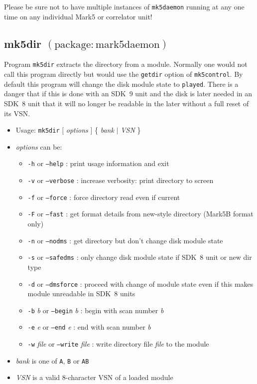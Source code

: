 Please be sure not to have multiple instances of {\tt mk5daemon} running at any one time on any individual Mark5 or correlator unit!








\subsection{mk5dir {\small $\mathrm{(package: mark5daemon)}$}} \label{sec:mk5dir}

Program {\tt mk5dir} extracts the directory from a module.
Normally one would not call this program directly but would use the {\tt getdir} option of {\tt mk5control}.
By default this program will change the disk module state to {\tt played}.
There is a danger that if this is done with an SDK~9 unit and the disk is later needed in an SDK~8 unit that it will no longer be readable in the later without a full reset of its VSN.

\begin{itemize}
\item[] Usage: {\tt mk5dir} $[$ {\em options} $]$ \{ {\em bank} $\mid$ {\em VSN} \}
\item[] {\em options} can be:
\begin{itemize}
\item[] {\tt -h} or {\tt --help} : print usage information and exit
\item[] {\tt -v} or {\tt --verbose} : increase verbosity: print directory to screen
\item[] {\tt -f} or {\tt --force} : force directory read even if current
\item[] {\tt -F} or {\tt --fast} : get format details from new-style directory (Mark5B format only)
\item[] {\tt -n} or {\tt --nodms} : get directory but don't change disk module state
\item[] {\tt -s} or {\tt --safedms} : only change disk module state if SDK~8 unit or new dir type
\item[] {\tt -d} or {\tt --dmsforce} : proceed with change of module state even if this makes module unreadable in SDK~8 units
\item[] {\tt -b} {\em b} or {\tt --begin} {\em b} : begin with scan number {\em b}
\item[] {\tt -e} {\em e} or {\tt --end} {\em e} : end with scan number {\em b}
\item[] {\tt -w} {\em file} or {\tt --write} {\em file} : write directory file {\em file} to the module
\end{itemize}
\item[] {\em bank} is one of {\tt A}, {\tt B} or {\tt AB}
\item[] {\em VSN} is a valid 8-character VSN of a loaded module
\end{itemize}

